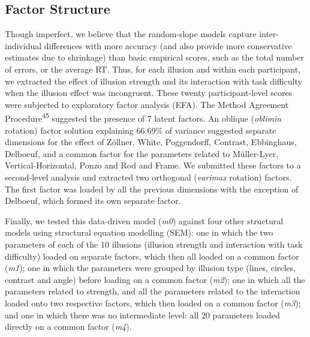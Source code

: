 \documentclass[
  man,floatsintext]{apa6}
\begin{document}
\hypertarget{factor-structure}{%
\subsection{Factor Structure}\label{factor-structure}}

Though imperfect, we believe that the random-slope models capture inter-individual differences with more accuracy (and also provide more conservative estimates due to shrinkage) than basic empirical scores, such as the total number of errors, or the average RT. Thus, for each illusion and within each participant, we extracted the effect of illusion strength and its interaction with task difficulty when the illusion effect was incongruent. These twenty participant-level scores were subjected to exploratory factor analysis (EFA). The Method Agreement Procedure\textsuperscript{45} suggested the presence of 7 latent factors. An oblique (\emph{oblimin} rotation) factor solution explaining 66.69\% of variance suggested separate dimensions for the effect of Zöllner, White, Poggendorff, Contrast, Ebbinghaus, Delboeuf, and a common factor for the parameters related to Müller-Lyer, Vertical-Horizontal, Ponzo and Rod and Frame. We submitted these factors to a second-level analysis and extracted two orthogonal (\emph{varimax} rotation) factors. The first factor was loaded by all the previous dimensions with the exception of Delboeuf, which formed its own separate factor.

Finally, we tested this data-driven model (\emph{m0}) against four other structural models using structural equation modelling (SEM): one in which the two parameters of each of the 10 illusions (illusion strength and interaction with task difficulty) loaded on separate factors, which then all loaded on a common factor (\emph{m1}); one in which the parameters were grouped by illusion type (lines, circles, contrast and angle) before loading on a common factor (\emph{m2}); one in which all the parameters related to strength, and all the parameters related to the interaction loaded onto two respective factors, which then loaded on a common factor (\emph{m3}); and one in which there was no intermediate level: all 20 parameters loaded directly on a common factor (\emph{m4}).
\end{document}
